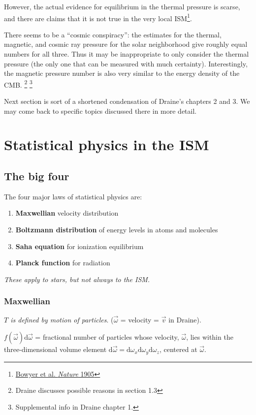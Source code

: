 \documentclass[12pt]{article}
\newcommand{\mar}[1]{\hspace{0pt}\marginpar{-\textcolor{black}{#1}-}}
\newcommand{\mynotes}[1]{{\fontfamily{cmss}\selectfont \textit{#1}}}
\let\oldsection\section
\renewcommand\section{\clearpage\oldsection}
\begin{document}
However, the actual evidence for equilibrium in the thermal pressure
is scarse, and there are claims that it is not true in the very local
ISM\footnote{\href{http://www.nature.com/nature/journal/v375/n6528/abs/375212a0.html}
{Bowyer et al. \textit{Nature} 1905}}.

There seems to be a ``cosmic conspiracy'': the estimates for the
thermal, magnetic, and cosmic ray pressure for the solar neighborhood
give roughly equal numbers for all three. Thus it may be inappropriate
to only consider the thermal pressure (the only one that can be
measured with much certainty). Interestingly, the magnetic pressure
number is also very similar to the energy density of the CMB\@.
\footnote{Draine discusses possible reasons in section 1.3}
\footnote{Supplemental info in Draine chapter 1.}

Next\mar{16} section is sort of a shortened condensation of Draine's chapters
2 and 3. We may come back to specific topics discussed there in more
detail.

\newpage
\section{Statistical physics in the ISM}
\subsection{The big four}
The four major laws of statistical physics are:
\begin{enumerate}
    \item \textbf{Maxwellian} velocity distribution
    \item \textbf{Boltzmann distribution} of energy levels in atoms and molecules
    \item \textbf{Saha equation} for ionization equilibrium
    \item \textbf{Planck function} for radiation
\end{enumerate}
\mynotes{These apply to stars, but not always to the ISM.}

\subsubsection{Maxwellian}
\mynotes{$T$ is defined by motion of particles}.
($\vec{\omega}$ = velocity = $\vec{v}$ in Draine).

$f(\vec{\omega})\mathrm{d}\vec{\omega}$ =
fractional number of particles whose velocity, $\vec{\omega}$, lies within the
three-dimensional volume element
$\mathrm{d}\vec{\omega} =
\mathrm{d}\omega_{x}\mathrm{d}\omega_{y}\mathrm{d}\omega_{z}$,
centered at $\vec{\omega}$.
\end{document}
